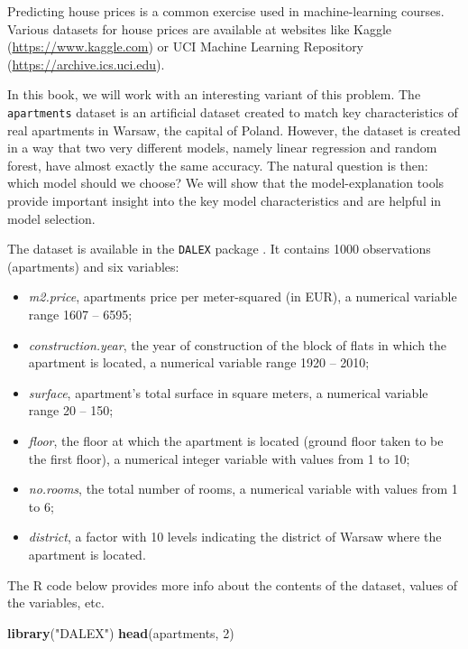 \documentclass[]{krantz}
\newenvironment{Shaded}{\begin{snugshade}}{\end{snugshade}}
\newcommand{\DecValTok}[1]{\textcolor[rgb]{0.00,0.00,0.81}{#1}}
\newcommand{\KeywordTok}[1]{\textcolor[rgb]{0.13,0.29,0.53}{\textbf{#1}}}
\newcommand{\NormalTok}[1]{#1}
\newcommand{\StringTok}[1]{\textcolor[rgb]{0.31,0.60,0.02}{#1}}
\providecommand{\tightlist}{%
  \setlength{\itemsep}{0pt}\setlength{\parskip}{0pt}}
\begin{document}
Predicting house prices is a common exercise used in machine-learning courses. Various datasets for house prices are available at websites like Kaggle (\url{https://www.kaggle.com}) or UCI Machine Learning Repository (\url{https://archive.ics.uci.edu}).

In this book, we will work with an interesting variant of this problem. The \texttt{apartments} dataset is an artificial dataset created to match key characteristics of real apartments in Warsaw, the capital of Poland. However, the dataset is created in a way that two very different models, namely linear regression and random forest, have almost exactly the same accuracy. The natural question is then: which model should we choose? We will show that the model-explanation tools provide important insight into the key model characteristics and are helpful in model selection.

The dataset is available in the \texttt{DALEX} package \citep{DALEX}. It contains 1000 observations (apartments) and six variables:

\begin{itemize}
\tightlist
\item
  \emph{m2.price}, apartments price per meter-squared (in EUR), a numerical variable range 1607 -- 6595;
\item
  \emph{construction.year}, the year of construction of the block of flats in which the apartment is located, a numerical variable range 1920 -- 2010;
\item
  \emph{surface}, apartment's total surface in square meters, a numerical variable range 20 -- 150;
\item
  \emph{floor}, the floor at which the apartment is located (ground floor taken to be the first floor), a numerical integer variable with values from 1 to 10;
\item
  \emph{no.rooms}, the total number of rooms, a numerical variable with values from 1 to 6;
\item
  \emph{district}, a factor with 10 levels indicating the district of Warsaw where the apartment is located.
\end{itemize}

The R code below provides more info about the contents of the dataset, values of the variables, etc.

\begin{Shaded}
\begin{Highlighting}[]
\KeywordTok{library}\NormalTok{(}\StringTok{"DALEX"}\NormalTok{)}
\KeywordTok{head}\NormalTok{(apartments, }\DecValTok{2}\NormalTok{)}
\end{Highlighting}
\end{Shaded}
\end{document}
